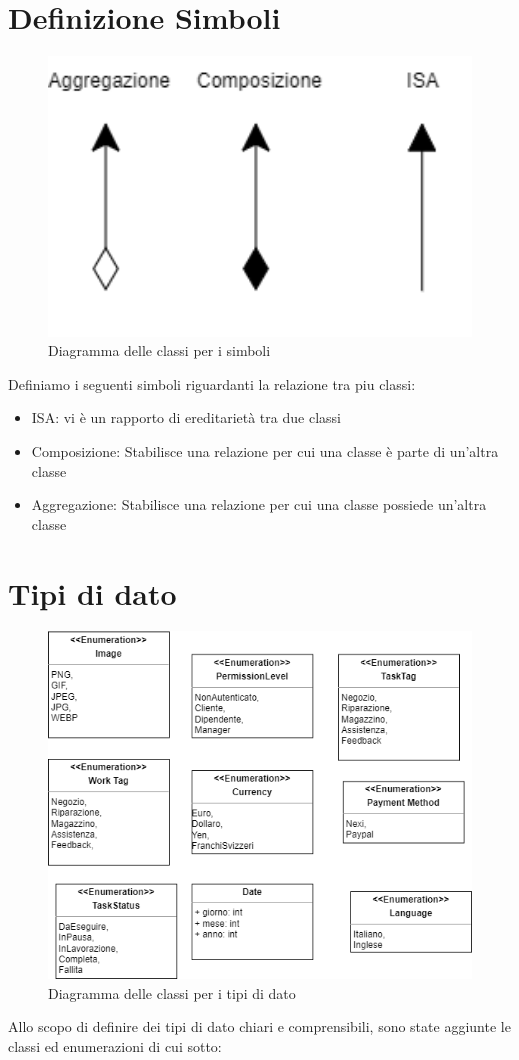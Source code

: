 \documentclass{report}
\begin{document}
\section{Definizione Simboli}
\begin{figure}[H]
	\centering\includegraphics[width=1\textwidth]{images/Diagramma_delle_classi_definizioni.png}
	Diagramma delle classi per i simboli 
\end{figure}
Definiamo i seguenti simboli riguardanti la relazione tra piu classi:
\begin{itemize}
	\item ISA: vi è un rapporto di ereditarietà tra due classi
	\item Composizione: Stabilisce una relazione per cui una classe è parte di un'altra classe
	\item Aggregazione: Stabilisce una relazione per cui una classe possiede un'altra classe 
\end{itemize}
\section{Tipi di dato}
\begin{figure}[H]
	\centering\includegraphics[width=1\textwidth]{images/Diagramma_delle_classi_Enumi.png}
	Diagramma delle classi per i tipi di dato
\end{figure}
Allo scopo di definire dei tipi di dato chiari e comprensibili, sono state aggiunte le classi ed enumerazioni di cui sotto:
\end{document}
